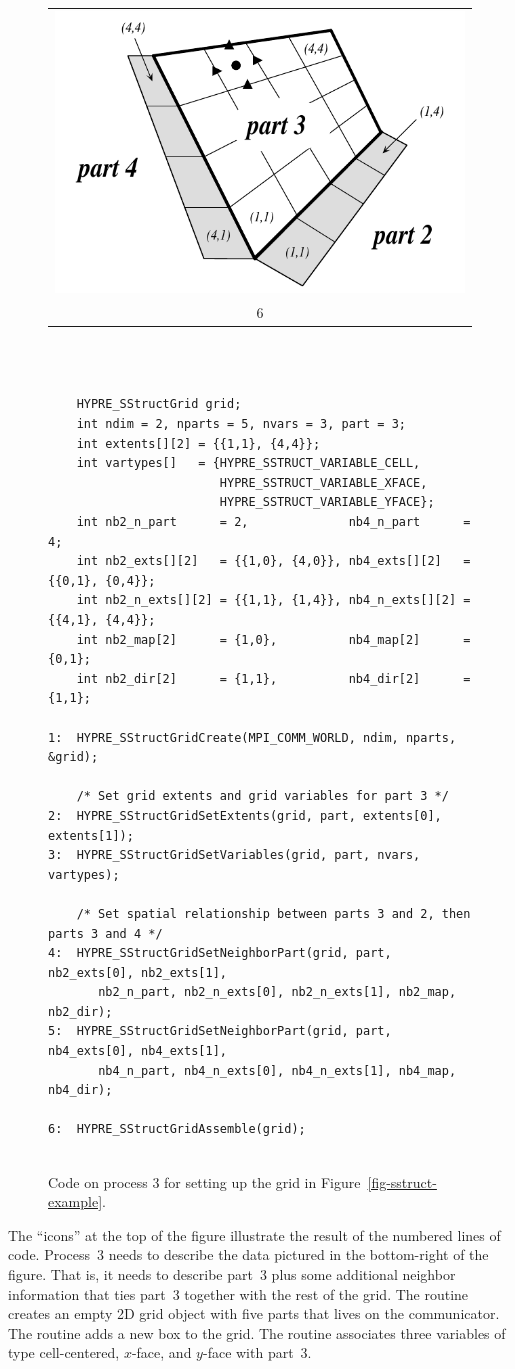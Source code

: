 \begin{figure}
\begin{tabular}{@{}c@{}}
\end{tabular}
\hfill
\begin{tabular}{@{}c@{}}
\includegraphics[width=.28\textwidth]{figSStructGrid6} \\ 6
\end{tabular}
\vspace{2em} \\
\begin{minipage}{0.9\textwidth}
\begin{verbatim}
    
    HYPRE_SStructGrid grid;
    int ndim = 2, nparts = 5, nvars = 3, part = 3;
    int extents[][2] = {{1,1}, {4,4}};
    int vartypes[]   = {HYPRE_SSTRUCT_VARIABLE_CELL,
                        HYPRE_SSTRUCT_VARIABLE_XFACE,
                        HYPRE_SSTRUCT_VARIABLE_YFACE};
    int nb2_n_part      = 2,              nb4_n_part      = 4;
    int nb2_exts[][2]   = {{1,0}, {4,0}}, nb4_exts[][2]   = {{0,1}, {0,4}};
    int nb2_n_exts[][2] = {{1,1}, {1,4}}, nb4_n_exts[][2] = {{4,1}, {4,4}};
    int nb2_map[2]      = {1,0},          nb4_map[2]      = {0,1};
    int nb2_dir[2]      = {1,1},          nb4_dir[2]      = {1,1};

1:  HYPRE_SStructGridCreate(MPI_COMM_WORLD, ndim, nparts, &grid);
    
    /* Set grid extents and grid variables for part 3 */
2:  HYPRE_SStructGridSetExtents(grid, part, extents[0], extents[1]);
3:  HYPRE_SStructGridSetVariables(grid, part, nvars, vartypes);
    
    /* Set spatial relationship between parts 3 and 2, then parts 3 and 4 */
4:  HYPRE_SStructGridSetNeighborPart(grid, part, nb2_exts[0], nb2_exts[1],
       nb2_n_part, nb2_n_exts[0], nb2_n_exts[1], nb2_map, nb2_dir);
5:  HYPRE_SStructGridSetNeighborPart(grid, part, nb4_exts[0], nb4_exts[1],
       nb4_n_part, nb4_n_exts[0], nb4_n_exts[1], nb4_map, nb4_dir);
    
6:  HYPRE_SStructGridAssemble(grid);
    
\end{verbatim}
\end{minipage}
\caption{%
Code on process 3 for setting up the grid in Figure~\ref{fig-sstruct-example}.}
\label{fig-sstruct-grid}
\end{figure}
The ``icons'' at the top of the figure illustrate the result of the numbered
lines of code.  Process~3 needs to describe the data pictured in the
bottom-right of the figure.  That is, it needs to describe part~3 plus some
additional neighbor information that ties part~3 together with the rest of the
grid.  The  routine creates an empty 2D grid object with five
parts that lives on the  communicator.  The
 routine adds a new box to the grid.  The
 routine associates three variables of type cell-centered,
$x$-face, and $y$-face with part~3.

